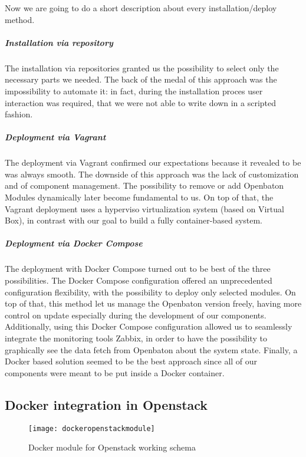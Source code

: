 Now we are going to do a short description about every installation/deploy method.

\subparagraph*{Installation via repository}
The installation via repositories granted us the possibility to select only the
necessary parts we needed. The back of the medal of this approach was the
impossibility to automate it: in fact, during the installation proces user
interaction was required, that we were not able to write down in a scripted
fashion.

\subparagraph*{Deployment via Vagrant}
The deployment via Vagrant confirmed our expectations because it revealed to be
was always smooth. The downside of this approach was the lack of customization
and of component management. The possibility to remove or add Openbaton Modules
dynamically later become fundamental to us. On top of that, the Vagrant
deployment uses a hyperviso virtualization system (based on Virtual Box), in
contrast with our goal to build a fully container-based system.

\subparagraph*{Deployment via Docker Compose}
The deployment with Docker Compose turned out to be best of the three
possibilities. The Docker Compose configuration offered an unprecedented
configuration flexibility, with the possibility to deploy only selected modules.
On top of that, this method let us manage the Openbaton version freely, having
more control on update especially during the development of our components.
Additionally, using this Docker Compose configuration allowed us to seamlessly
integrate the monitoring tools Zabbix, in order to have the possibility to
graphically see the data fetch from Openbaton about the system state. Finally, a
Docker based solution seemed to be the best approach since all of our components
were meant to be put inside a Docker container.

\subsection{Docker integration in Openstack}

\begin{figure}[t]
  \centering
  \texttt{[image: dockeropenstackmodule]}
  \caption[Docker module for Openstack working schema]{Docker module for Openstack
    working schema~\cite{openstackDockerModule}}
  \label{chap:archimpl:sec:fistattempt:img:dockeropnestackmodule}
\end{figure}

